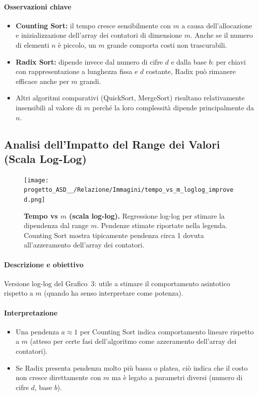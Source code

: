 \documentclass[a4paper, 11pt]{article}
\begin{document}
\paragraph{Osservazioni chiave}
\begin{itemize}
  \item \textbf{Counting Sort:} il tempo cresce sensibilmente con \(m\) a causa dell'allocazione e inizializzazione dell'array dei contatori di dimensione \(m\). Anche se il numero di elementi \(n\) è piccolo, un \(m\) grande comporta costi non trascurabili.
  \item \textbf{Radix Sort:} dipende invece dal numero di cifre \(d\) e dalla base \(b\): per chiavi con rappresentazione a lunghezza fissa e \(d\) costante, Radix può rimanere efficace anche per \(m\) grandi.
  \item Altri algoritmi comparativi (QuickSort, MergeSort) risultano relativamente insensibili al valore di \(m\) perché la loro complessità dipende principalmente da \(n\).
\end{itemize}

\subsection{Analisi dell'Impatto del Range dei Valori (Scala Log-Log)}
\begin{figure}[H]
\centering
\texttt{[image: progetto\_ASD\_\_/Relazione/Immagini/tempo\_vs\_m\_loglog\_improved.png]}
\caption{\textbf{Tempo vs \(m\) (scala log-log).} Regressione log-log per stimare la dipendenza dal range \(m\). Pendenze stimate riportate nella legenda. Counting Sort mostra tipicamente pendenza circa 1 dovuta all'azzeramento dell'array dei contatori.}
\label{fig:variazione_m}
\end{figure}

\paragraph{Descrizione e obiettivo}
Versione log-log del Grafico~3: utile a stimare il comportamento asintotico rispetto a \(m\) (quando ha senso interpretare come potenza).

\paragraph{Interpretazione}
\begin{itemize}
  \item Una pendenza \(a\approx 1\) per Counting Sort indica comportamento lineare rispetto a \(m\) (atteso per certe fasi dell'algoritmo come azzeramento dell'array dei contatori).
  \item Se Radix presenta pendenza molto più bassa o platea, ciò indica che il costo non cresce direttamente con \(m\) ma è legato a parametri diversi (numero di cifre \(d\), base \(b\)).
\end{itemize}
\end{document}
